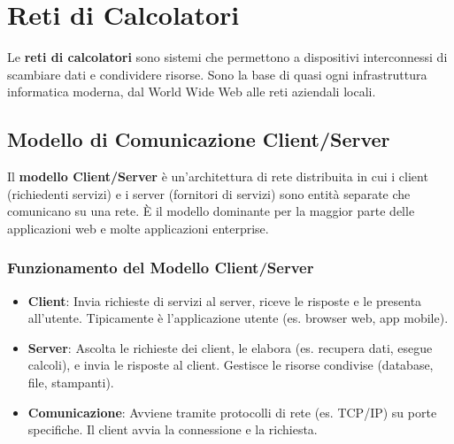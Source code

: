 \chapter{Reti di Calcolatori}

Le \textbf{reti di calcolatori} sono sistemi che permettono a dispositivi interconnessi di scambiare dati e condividere risorse. Sono la base di quasi ogni infrastruttura informatica moderna, dal World Wide Web alle reti aziendali locali.

\section{Modello di Comunicazione Client/Server}
Il \textbf{modello Client/Server} è un'architettura di rete distribuita in cui i client (richiedenti servizi) e i server (fornitori di servizi) sono entità separate che comunicano su una rete. È il modello dominante per la maggior parte delle applicazioni web e molte applicazioni enterprise.

\subsection{Funzionamento del Modello Client/Server}
\begin{itemize}
    \item \textbf{Client}: Invia richieste di servizi al server, riceve le risposte e le presenta all'utente. Tipicamente è l'applicazione utente (es. browser web, app mobile).
    \item \textbf{Server}: Ascolta le richieste dei client, le elabora (es. recupera dati, esegue calcoli), e invia le risposte al client. Gestisce le risorse condivise (database, file, stampanti).
    \item \textbf{Comunicazione}: Avviene tramite protocolli di rete (es. TCP/IP) su porte specifiche. Il client avvia la connessione e la richiesta.
\end{itemize}

